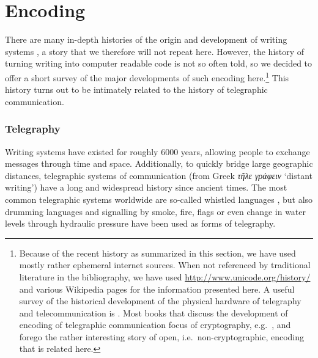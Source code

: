 \section{Encoding}
\label{encoding}

There are many in-depth histories of the origin and development of writing
systems \citep[e.g.~][]{Robinson1995,Powell2012}, a story that we therefore will
not repeat here. However, the history of turning writing into computer readable
code is not so often told, so we decided to offer a short survey of the major
developments of such encoding here.\footnote{Because of the recent
history as summarized in this section, we have used mostly rather ephemeral
internet sources. When not referenced by traditional literature in the
bibliography, we have used \url{http://www.unicode.org/history/} and various
Wikipedia pages for the information presented here. A useful survey of the
historical development of the physical hardware of telegraphy and
telecommunication is \citet{Huurdeman2003}. Most books that discuss the
development of encoding of telegraphic communication focus of cryptography,
e.g.~\citet{Singh1999}, and forego the rather interesting story of open,
i.e.~non-cryptographic, encoding that is related here.} This history turns out
to be intimately related to the history of telegraphic communication.

\subsubsection*{Telegraphy}

Writing systems have existed for roughly 6000 years, allowing people to exchange
messages through time and space. Additionally, to quickly bridge large geographic
distances, telegraphic systems of communication (from Greek \emph{τῆλε
γράφειν} `distant writing') have a long and widespread history since ancient
times. The most common telegraphic systems worldwide are so-called whistled
languages \citep{Meyer2015}, but also drumming languages \citep{Meyer2012} and
signalling by smoke, fire, flags or even change in water levels through
hydraulic pressure have been used as forms of telegraphy. 


